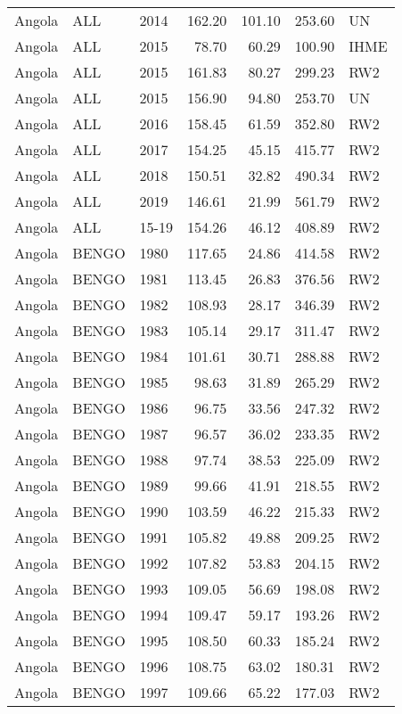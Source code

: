\begin{longtable}{lllrrrl}
  Angola & ALL & 2014 & 162.20 & 101.10 & 253.60 & UN \\ 
  Angola & ALL & 2015 & 78.70 & 60.29 & 100.90 & IHME \\ 
  Angola & ALL & 2015 & 161.83 & 80.27 & 299.23 & RW2 \\ 
  Angola & ALL & 2015 & 156.90 & 94.80 & 253.70 & UN \\ 
  Angola & ALL & 2016 & 158.45 & 61.59 & 352.80 & RW2 \\ 
  Angola & ALL & 2017 & 154.25 & 45.15 & 415.77 & RW2 \\ 
  Angola & ALL & 2018 & 150.51 & 32.82 & 490.34 & RW2 \\ 
  Angola & ALL & 2019 & 146.61 & 21.99 & 561.79 & RW2 \\ 
  Angola & ALL & 15-19 & 154.26 & 46.12 & 408.89 & RW2 \\ 
  Angola & BENGO & 1980 & 117.65 & 24.86 & 414.58 & RW2 \\ 
  Angola & BENGO & 1981 & 113.45 & 26.83 & 376.56 & RW2 \\ 
  Angola & BENGO & 1982 & 108.93 & 28.17 & 346.39 & RW2 \\ 
  Angola & BENGO & 1983 & 105.14 & 29.17 & 311.47 & RW2 \\ 
  Angola & BENGO & 1984 & 101.61 & 30.71 & 288.88 & RW2 \\ 
  Angola & BENGO & 1985 & 98.63 & 31.89 & 265.29 & RW2 \\ 
  Angola & BENGO & 1986 & 96.75 & 33.56 & 247.32 & RW2 \\ 
  Angola & BENGO & 1987 & 96.57 & 36.02 & 233.35 & RW2 \\ 
  Angola & BENGO & 1988 & 97.74 & 38.53 & 225.09 & RW2 \\ 
  Angola & BENGO & 1989 & 99.66 & 41.91 & 218.55 & RW2 \\ 
  Angola & BENGO & 1990 & 103.59 & 46.22 & 215.33 & RW2 \\ 
  Angola & BENGO & 1991 & 105.82 & 49.88 & 209.25 & RW2 \\ 
  Angola & BENGO & 1992 & 107.82 & 53.83 & 204.15 & RW2 \\ 
  Angola & BENGO & 1993 & 109.05 & 56.69 & 198.08 & RW2 \\ 
  Angola & BENGO & 1994 & 109.47 & 59.17 & 193.26 & RW2 \\ 
  Angola & BENGO & 1995 & 108.50 & 60.33 & 185.24 & RW2 \\ 
  Angola & BENGO & 1996 & 108.75 & 63.02 & 180.31 & RW2 \\ 
  Angola & BENGO & 1997 & 109.66 & 65.22 & 177.03 & RW2 \\ 

\end{longtable}
